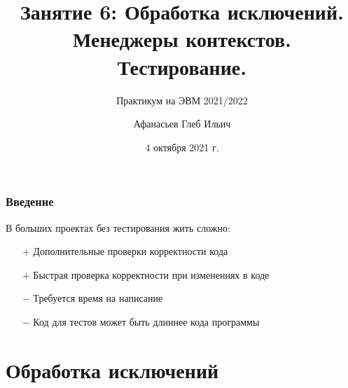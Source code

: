 \documentclass[fleqn, xcolor=x11names]{beamer}
\title[Введение в Python]{\bfseries Занятие 6: Обработка исключений. Менеджеры контекстов. Тестирование.}
\author[Афанасьев~Г.\,И.]{Афанасьев Глеб Ильич}
\subtitle{Практикум на ЭВМ 2021/2022}
\institute[ВМК МГУ]{МГУ имени М. В. Ломоносова, факультет ВМК, кафедра ММП}
\date{4 октября 2021 г.}
\begin{document}
\begin{frame}
\maketitle
\end{frame} 

\begin{frame}[fragile]\frametitle{Введение}

В больших проектах без тестирования жить сложно:

\begin{itemize}

\item[+] Дополнительные проверки корректности кода

\item[+] Быстрая проверка корректности при изменениях в коде

\item[$-$] Требуется время на написание

\item[$-$] Код для тестов может быть длиннее кода программы
\end{itemize}

\end{frame} 


\section{Обработка исключений}
\subsection*{}
\end{document}
